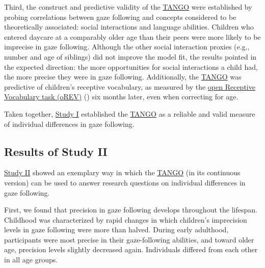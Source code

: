 \documentclass[
]{scrbook}
\begin{document}
Third, the construct and predictive validity of the \hyperref[acronyms_TANGO]{TANGO} were established by probing correlations between gaze following and concepts considered to be theoretically associated: social interactions and language abilities. Children who entered daycare at a comparably older age than their peers were more likely to be imprecise in gaze following. Although the other social interaction proxies (e.g., number and age of siblings) did not improve the model fit, the results pointed in the expected direction: the more opportunities for social interactions a child had, the more precise they were in gaze following. Additionally, the \hyperref[acronyms_TANGO]{TANGO} was predictive of children's receptive vocabulary, as measured by the \hyperref[acronyms_oREV]{open Receptive Vocabulary task (oREV)} () six months later, even when correcting for age.

Taken together, \hyperref[studyI]{Study I} established the \hyperref[acronyms_TANGO]{TANGO} as a reliable and valid measure of individual differences in gaze following.

\subsection{Results of Study II}\label{results-studyII}

\hyperref[studyII]{Study II} showed an exemplary way in which the \hyperref[acronyms_TANGO]{TANGO} (in its continuous version) can be used to answer research questions on individual differences in gaze following.

First, we found that precision in gaze following develops throughout the lifespan. Childhood was characterized by rapid changes in which children's imprecision levels in gaze following were more than halved. During early adulthood, participants were most precise in their gaze-following abilities, and toward older age, precision levels slightly decreased again. Individuals differed from each other in all age groups.
\end{document}
